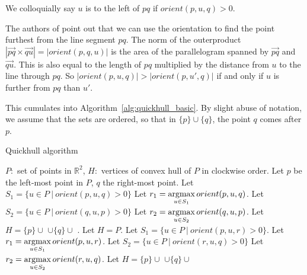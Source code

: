 We colloquially say $u$ is to the left of $pq$ if $orient(p, u, q) > 0$.

The authors of \cite{quickerthanqhull} point out that we can use the 
orientation to find the point furthest from the line segment $pq$. 
The norm of the outerproduct
$|\vec{pq} \times \vec{qu}| = |orient(p, q, u)|$ is the area of the
parallelogram spanned by $\vec{pq}$ and $\vec{qu}$. This is also equal to
the length of $pq$ multiplied by the distance from $u$ to the line through 
$pq$. So $|orient(p, u, q)| > |orient(p, u', q)|$ if and only if $u$ is further
from $pq$ than $u'$.

This cumulates into Algorithm~\ref{alg:quickhull_basic}. By slight abuse
of notation, we assume that the sets are ordered, so that in $\{p\} \cup \{q\}$,
the point $q$ comes after $p$.

\begin{algorithm}[ht]
\begin{algorithmic}[1]
    \caption{Quickhull algorithm}\label{alg:quickhull_basic}
    \Require $P: $ set of points in $\mathbb{R}^2$,
    \Ensure $H: $ vertices of convex hull of $P$ in clockwise order.
    \State Let $p$ be the left-most point in $P$, $q$ the right-most point.
    \State Let $S_1 = \{u \in P \ | \ orient(p, u, q) > 0\}$
    \State Let $r_1 = \operatorname*{argmax}\limits_{u \in S_1}orient(p, u, q)$.
    \State Let $S_2 = \{u \in P \ | \ orient(q, u, p) > 0\}$
    \State Let $r_2 = \operatorname*{argmax}\limits_{u \in S_2}orient(q, u, p)$.
    \State Let $H = \{p\} \cup $ 
            $\cup \{q\} \cup$ .
            \State Let $H = P$.
        \Else
            \State Let $S_1 = \{u \in P \ | \ orient(p, u, r) > 0\}$.
            \State Let $r_1 = \operatorname*{argmax}\limits_{u \in S_1}orient(p, u, r)$.
            \State Let $S_2 = \{u \in P \ | \ orient(r, u, q) > 0\}$
            \State Let $r_2 = \operatorname*{argmax}\limits_{u \in S_2}orient(r, u, q)$.
            \State Let $H = \{p\} \cup $ 
                   $\cup \{q\} \cup$ 
        \EndIf
    \EndFunction
\end{algorithmic}
\end{algorithm}
